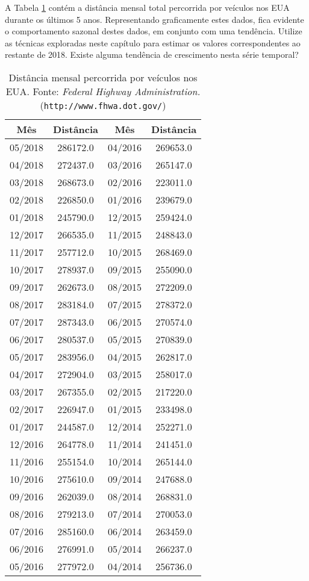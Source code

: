 \begin{problem}
A Tabela \ref{tab_carros} contém a distância mensal total percorrida por veículos nos EUA durante os últimos 5 anos. Representando graficamente estes dados, fica evidente o comportamento sazonal destes dados, em conjunto com uma tendência. Utilize as técnicas exploradas neste capítulo para estimar os valores correspondentes ao restante de 2018. Existe alguma tendência de crescimento nesta série temporal?

		\begin{table}[tb]
		\begin{center}
		\begin{tabular}{|c|c||c|c|}
			\hline
			Mês & Distância & Mês & Distância\\
			\hline
            \hline
05/2018 &	286172.0&	04/2016&		269653.0\\
04/2018 &	272437.0&	03/2016&		265147.0\\
03/2018 &	268673.0&	02/2016&		223011.0\\
02/2018 &	226850.0&	01/2016&		239679.0\\
01/2018 &	245790.0&	12/2015&		259424.0\\
12/2017 &	266535.0&	11/2015&		248843.0\\
11/2017 &	257712.0&	10/2015&		268469.0\\
10/2017 &	278937.0&	09/2015&		255090.0\\
09/2017 &	262673.0&	08/2015&		272209.0\\
08/2017 &	283184.0&	07/2015&		278372.0\\
07/2017 &	287343.0&	06/2015&		270574.0\\
06/2017 &	280537.0&	05/2015&		270839.0\\
05/2017  &	283956.0&	04/2015&		262817.0\\
04/2017  &	272904.0&	03/2015&		258017.0\\
03/2017  &	267355.0&	02/2015&		217220.0\\
02/2017  &	226947.0&	01/2015&		233498.0\\
01/2017  &	244587.0&	12/2014&		252271.0\\
12/2016 &	264778.0&	11/2014&		241451.0\\
11/2016 &	255154.0&	10/2014&		265144.0\\
10/2016 &	275610.0&	09/2014&		247688.0\\
09/2016 &	262039.0&	08/2014&		268831.0\\
08/2016 &	279213.0&	07/2014&		270053.0\\
07/2016 &	285160.0&	06/2014&		263459.0\\
06/2016 &	276991.0&	05/2014&		266237.0\\
05/2016 &	277972.0&	04/2014&		256736.0\\
			\hline
		\end{tabular}\\
		\end{center}
        \caption{Distância mensal percorrida por veículos nos EUA. Fonte: {\em Federal Highway Administration.} ({\tt http://www.fhwa.dot.gov/})}\label{tab_carros}
		\end{table}
\end{problem}

